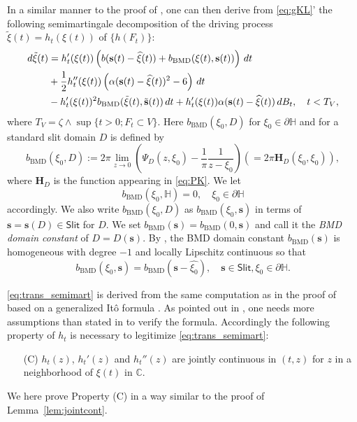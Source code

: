 \documentclass[preprint,12pt]{elsarticle}
\theoremstyle{definition}
\newcommand{\C}{\mathbb{C}}
\newcommand{\bmd}{\mathrm{BMD}}
\newcommand{\uhp}{\mathbb{H}}
\newcommand{\Slit}{\mathsf{Slit}}
\newcommand{\slit}{\mathbf{s}}
\begin{document}
In a similar manner to the proof of \cite[Theorem~6.9]{CF18},
one can then derive from \eqref{eq:gKL}'
the following semimartingale decomposition of the driving process
$\tilde{\xi}(t)=h_t(\xi(t))$ of $\{h(F_t)\}$:
\begin{align}
d\tilde{\xi}(t)&=
h_t'(\xi(t))\left(b(\slit(t)-\widehat{\xi}(t))+b_{\bmd}(\xi(t), \slit(t))\right)\,dt
\notag \\
&+\frac{1}{2}h_t''(\xi(t))\left(\alpha(\slit(t)-\widehat{\xi}(t))^2-6\right)\,dt
\label{eq:trans_semimart} \\
&-h_t'(\xi(t))^2b_{\bmd}(\tilde{\xi}(t), \tilde{\slit}(t))\,dt
+h_t'(\xi(t))\alpha(\slit(t)-\widehat{\xi}(t))\,dB_t, \quad t < T_V, \notag
\end{align}
where $T_V=\zeta \wedge \sup\{t>0; F_t \subset V\}$.
Here $b_{\bmd}(\xi_0, D)$ for $\xi_0 \in \partial \uhp$ and
for a standard slit domain $D$ is defined by
\[
b_{\bmd}(\xi_0, D) := 2\pi\lim_{z \to 0}
\left(\Psi_D(z, \xi_0)-\frac{1}{\pi}\frac{1}{ z-\xi_0}\right)
(=2\pi\mathbf{H}_D(\xi_0, \xi_0)),
\]
where $\mathbf{H}_D$ is the function appearing in \eqref{eq:PK}.
We let
\[
b_{\bmd}(\xi_0, \uhp)=0, \quad \xi_0 \in \partial \uhp
\]
accordingly.
We also write $b_{\bmd}(\xi_0, D)$ as $b_{\bmd}(\xi_0, \slit)$ in terms of
$\slit=\slit(D) \in \Slit$ for $D$.
We set $b_{\bmd}(\slit)=b_{\bmd}(0, \slit)$ and
call it the \emph{BMD domain constant} of $D=D(\slit)$.
By \cite[Lemma~6.1]{CF18}, the BMD domain constant $b_{\bmd}(\slit)$
is homogeneous with degree $-1$ and locally Lipschitz continuous so that
\[
b_{\bmd}(\xi_0, \slit)=b_{\bmd}(\slit-\widehat{\xi_0}),
\quad \slit \in \Slit, \xi_0 \in \partial \uhp.
\]

\eqref{eq:trans_semimart} is derived from the same computation
as in the proof of \cite[Theorem~6.9]{CF18} based on a generalized It\^o formula
\cite[Exercise~IV.3.12]{RY99}.
As pointed out in \cite[Remark~2.9]{CFS17},
one needs more assumptions than stated in \cite{RY99} to verify the formula.
Accordingly the following property of $h_t$ is necessary
to legitimize \eqref{eq:trans_semimart}:
\begin{enumerate}
\item[(C)] $h_t(z)$, $h_t'(z)$ and $h_t''(z)$ are jointly continuous
in $(t,z)$ for $z$ in a neighborhood of $\xi(t)$ in $\C$.
\end{enumerate}
We here prove Property (C) in a way similar to the proof
of Lemma~\ref{lem:jointcont}.
\end{document}
